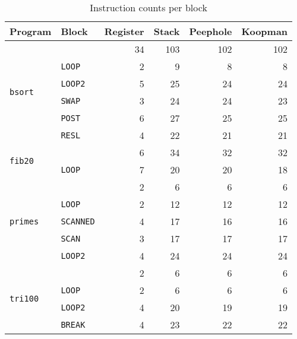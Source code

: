 \begin{table}
\begin{tabular}{l l r r r r}
  Program & Block & Register & Stack & Peephole & Koopman \\ \toprule
  \multirow{6}{*}{\texttt{bsort}}  & & 34 & 103 & 102 & 102 \\
  & \texttt{LOOP}                    &  2 &   9 &   8 &   8 \\
  & \texttt{LOOP2}                   &  5 &  25 &  24 &  24 \\
  & \texttt{SWAP}                    &  3 &  24 &  24 &  23 \\
  & \texttt{POST}                    &  6 &  27 &  25 &  25 \\
  & \texttt{RESL}                    &  4 &  22 &  21 &  21 \\ \midrule
  \multirow{2}{*}{\texttt{fib20}}  & &  6 &  34 &  32 &  32 \\
  & \texttt{LOOP}                    &  7 &  20 &  20 &  18 \\ \midrule
  \multirow{5}{*}{\texttt{primes}} & &  2 &   6 &   6 &   6 \\
  & \texttt{LOOP}                    &  2 &  12 &  12 &  12 \\
  & \texttt{SCANNED}                 &  4 &  17 &  16 &  16 \\
  & \texttt{SCAN}                    &  3 &  17 &  17 &  17 \\
  & \texttt{LOOP2}                   &  4 &  24 &  24 &  24 \\ \midrule
  \multirow{5}{*}{\texttt{tri100}} & &  2 &   6 &   6 &   6 \\
  & \texttt{LOOP}                    &  2 &   6 &   6 &   6 \\
  & \texttt{LOOP2}                   &  4 &  20 &  19 &  19 \\
  & \texttt{BREAK}                   &  4 &  23 &  22 &  22 \\
\end{tabular}
\caption{Instruction counts per block}\label{tab:instructionperblock}
\end{table}

\blockdata%

